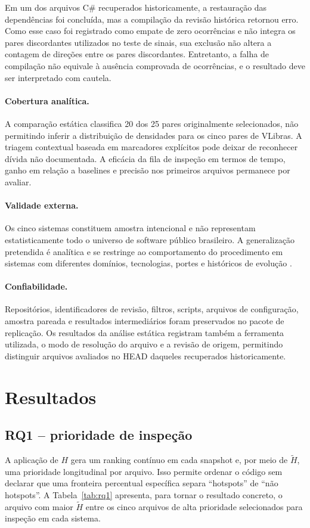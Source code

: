 \documentclass[12pt]{article}
\begin{document}
Em um dos arquivos C\# recuperados historicamente, a restauração das dependências foi concluída, mas a compilação da revisão histórica retornou erro. Como esse caso foi registrado como empate de zero ocorrências e não integra os pares discordantes utilizados no teste de sinais, sua exclusão não altera a contagem de direções entre os pares discordantes. Entretanto, a falha de compilação não equivale à ausência comprovada de ocorrências, e o resultado deve ser interpretado com cautela.

\paragraph{Cobertura analítica.} A comparação estática classifica 20 dos 25 pares originalmente selecionados, não permitindo inferir a distribuição de densidades para os cinco pares de VLibras. A triagem contextual baseada em marcadores explícitos pode deixar de reconhecer dívida não documentada. A eficácia da fila de inspeção em termos de tempo, ganho em relação a baselines e precisão nos primeiros arquivos permanece por avaliar.

\paragraph{Validade externa.} Os cinco sistemas constituem amostra intencional e não representam estatisticamente todo o universo de software público brasileiro. A generalização pretendida é analítica e se restringe ao comportamento do procedimento em sistemas com diferentes domínios, tecnologias, portes e históricos de evolução \cite{baltes2022sampling}.

\paragraph{Confiabilidade.} Repositórios, identificadores de revisão, filtros, scripts, arquivos de configuração, amostra pareada e resultados intermediários foram preservados no pacote de replicação. Os resultados da análise estática registram também a ferramenta utilizada, o modo de resolução do arquivo e a revisão de origem, permitindo distinguir arquivos avaliados no HEAD daqueles recuperados historicamente.


\section{Resultados}

\subsection{RQ1 -- prioridade de inspeção}
A aplicação de $H$ gera um ranking contínuo em cada snapshot e, por meio de $\widetilde H$, uma prioridade longitudinal por arquivo. Isso permite ordenar o código sem declarar que uma fronteira percentual específica separa ``hotspots'' de ``não hotspots''. A Tabela~\ref{tab:rq1} apresenta, para tornar o resultado concreto, o arquivo com maior $\widetilde H$ entre os cinco arquivos de alta prioridade selecionados para inspeção em cada sistema.
\end{document}

